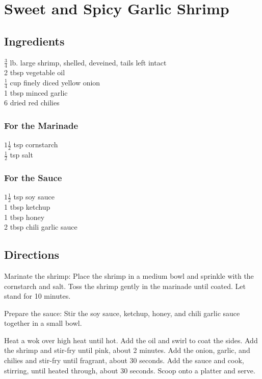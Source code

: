 \documentclass{article}
\newcounter{qcounter}
\begin{document}
\section*{Sweet and Spicy Garlic Shrimp}

\subsection*{Ingredients}
$\frac{3}{4}$ lb. large shrimp, shelled, deveined, tails left intact\\
2 tbsp vegetable oil\\
$\frac{1}{4}$  cup finely diced yellow onion\\
1 tbsp minced garlic\\
6 dried red chilies\\

\subsubsection*{For the Marinade}
$1 \frac{1}{2}$ tsp cornstarch\\
$\frac{1}{2}$ tsp salt\\

\subsubsection*{For the Sauce}
$1 \frac{1}{2}$ tsp soy sauce\\
1 tbsp ketchup\\
1 tbsp honey\\
2 tbsp chili garlic sauce\\

\subsection*{Directions}
\begin{list}{:~}{}
\item Marinate the shrimp:  Place the shrimp in a medium bowl and sprinkle with the cornstarch and salt. Toss the shrimp gently in the marinade until coated.  Let stand for 10 minutes. 
\item Prepare the sauce:  Stir the soy sauce, ketchup, honey, and chili garlic sauce together in a small bowl.
\item Heat a wok over high heat until hot.  Add the oil and swirl to coat the sides.  Add the shrimp and stir-fry until pink, about 2 minutes.  Add the onion, garlic, and chilies and stir-fry until fragrant, about 30 seconds.  Add the sauce and cook, stirring, until heated through, about 30 seconds.  Scoop onto a platter and serve.
\end{list}
\end{document}
